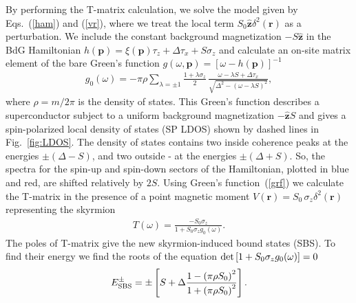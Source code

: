 \documentclass[twocolumn,showpacs,floatfix,longbibliography]{revtex4-1}
\begin{document}
By performing the T-matrix calculation, we solve the model given by Eqs.~(\ref{ham}) and (\ref{vr}), where we treat the local term $S_0 \hat{\bm z} \delta^2(\bm r)$ as a perturbation. We include the constant background magnetization $-S\hat{\bm z}$ in the BdG Hamiltonian $h(\bm p) = \xi(\bm p)\tau_z+\Delta \tau_x +  S\sigma_z$  and calculate an on-site matrix element of the bare Green's function $g(\omega,\bm p) = [\omega-h(\bm p)]^{-1}$ 
 \begin{align}
	 g_{0}(\omega)  =-\pi\rho\sum_{\lambda = \pm 1} \frac{1+\lambda\sigma_z}{2}\,\frac{\omega-\lambda S+\Delta\tau_x}{\sqrt{\Delta^2-\left( \omega-\lambda S \right)^2}},  \label{grf}
\end{align}
where $\rho = m/2\pi$ is the density of states. This Green's function describes a superconductor subject to a uniform background magnetization $-\hat{\bm z} S$ and gives a spin-polarized local density of states (SP LDOS) shown by dashed lines in Fig.~\ref{fig:LDOS}.  The density of states contains two inside coherence peaks at the energies $\pm(\Delta-S)$, and two outside - at the energies $\pm(\Delta+S)$.  So, the spectra for the spin-up and spin-down sectors of the Hamiltonian, plotted in blue and red, are shifted relatively by $2S$. Using Green's function~(\ref{grf}) we calculate the T-matrix in the presence of a point magnetic moment $V(\bm r)=S_0\,\sigma_z \delta^2(\bm r)$ representing the skyrmion
\begin{align}
	T(\omega) =   \frac{-S_0\sigma_z}{1+S_0\sigma_zg_{0}(\omega)}. \label{tm} 
\end{align}
The poles of T-matrix give the new skyrmion-induced bound states (SBS). To find their energy we find the roots of the equation ${\rm det} \left[1+S_0\sigma_zg_{0}(\omega)\right]=0$
\begin{align}
	E^\pm_{\rm SBS} = \pm\left[S+\Delta \frac{1-\left( \pi\rho S_0 \right)^2}{1+\left( \pi\rho S_0 \right)^2}\right].
	\label{energy}
\end{align}
\end{document}

